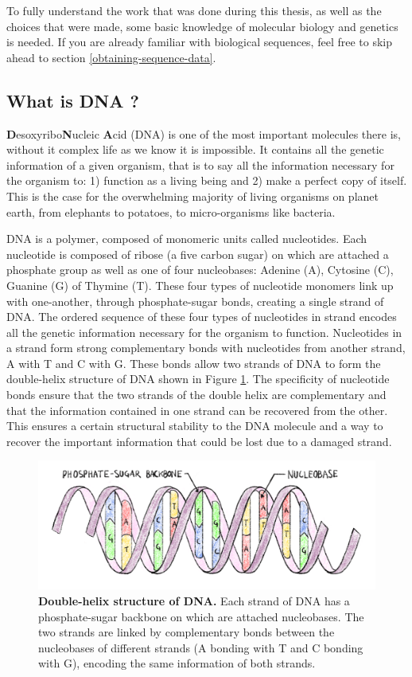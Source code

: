 \documentclass[
  11pt,
  twoside,
  BCOR=10mm,
  listof=totoc]{scrbook}
\newcommand{\extcaption}[2]{
    \caption[#1]{
        \textbf{#1}\newline
        #2
    }
}
\begin{document}
To fully understand the work that was done during this thesis, as well as the choices that were made, some basic knowledge of molecular biology and genetics is needed. If you are already familiar with biological sequences, feel free to skip ahead to section \ref{obtaining-sequence-data}.

\hypertarget{what-is-dna}{%
\subsection{What is DNA ?}\label{what-is-dna}}

\textbf{D}esoxyribo\textbf{N}ucleic \textbf{A}cid (DNA) is one of the most important molecules there is, without it complex life as we know it is impossible. It contains all the genetic information of a given organism, that is to say all the information necessary for the organism to: 1) function as a living being and 2) make a perfect copy of itself. This is the case for the overwhelming majority of living organisms on planet earth, from elephants to potatoes, to micro-organisms like bacteria.

DNA is a polymer, composed of monomeric units called nucleotides. Each nucleotide is composed of ribose (a five carbon sugar) on which are attached a phosphate group as well as one of four nucleobases: Adenine (A), Cytosine (C), Guanine (G) of Thymine (T). These four types of nucleotide monomers link up with one-another, through phosphate-sugar bonds, creating a single strand of DNA. The ordered sequence of these four types of nucleotides in strand encodes all the genetic information necessary for the organism to function. Nucleotides in a strand form strong complementary bonds with nucleotides from another strand, A with T and C with G. These bonds allow two strands of DNA to form the double-helix structure of DNA \autocite{watson1953} shown in Figure \ref{fig:figDNA}. The specificity of nucleotide bonds ensure that the two strands of the double helix are complementary and that the information contained in one strand can be recovered from the other. This ensures a certain structural stability to the DNA molecule and a way to recover the important information that could be lost due to a damaged strand.

\begin{figure}[h]
\centering
\includegraphics[width=\linewidth]{./figures/Sequence-Intro/DNA.png}
\extcaption{Double-helix structure of DNA.}{Each strand of DNA has a phosphate-sugar backbone on which are attached nucleobases. The two strands are linked by complementary bonds between the nucleobases of different strands (A bonding with T and C bonding with G), encoding the same information of both strands.}
\label{fig:figDNA}
\end{figure}
\end{document}
